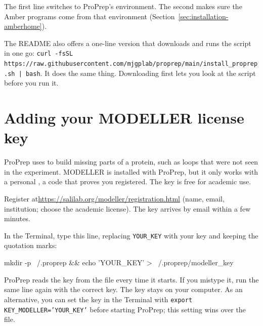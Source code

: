 
The first line switches to ProPrep's environment. The second makes sure the
Amber programs come from that environment
(Section~\ref{sec:installation-amberhome}).

\begin{tip}
The README also offers a one-line version that downloads and runs the script
in one go:
\texttt{curl -fsSL https://raw.githubusercontent.com/mjgplab/proprep/main/install\_proprep.sh | bash}.
It does the same thing. Downloading first lets you look at the script before you
run it.
\end{tip}

\section{Adding your MODELLER license key}
\label{sec:installation-modeller}

ProPrep uses  to build missing parts of a protein, such as
loops that were not seen in the experiment. MODELLER is installed with ProPrep,
but it only works with a personal , a code that proves you
registered. The key is free for academic use.

\begin{steps}
  \item Register at\newline \url{https://salilab.org/modeller/registration.html}\newline
        (name, email, institution; choose the academic license). The key
        arrives by email within a few minutes.
  \item In the Terminal, type this line, replacing \texttt{YOUR\_KEY} with
        your key and keeping the quotation marks:
\begin{terminal}
mkdir -p ~/.proprep && echo 'YOUR_KEY' > ~/.proprep/modeller_key
\end{terminal}
\end{steps}

ProPrep reads the key from the file  every time
it starts. If you mistype it, run the same line again with the correct key.
The key stays on your computer. As an alternative, you can set the key in the
Terminal with \texttt{export KEY\_MODELLER='YOUR\_KEY'} before starting
ProPrep; this setting wins over the file.

